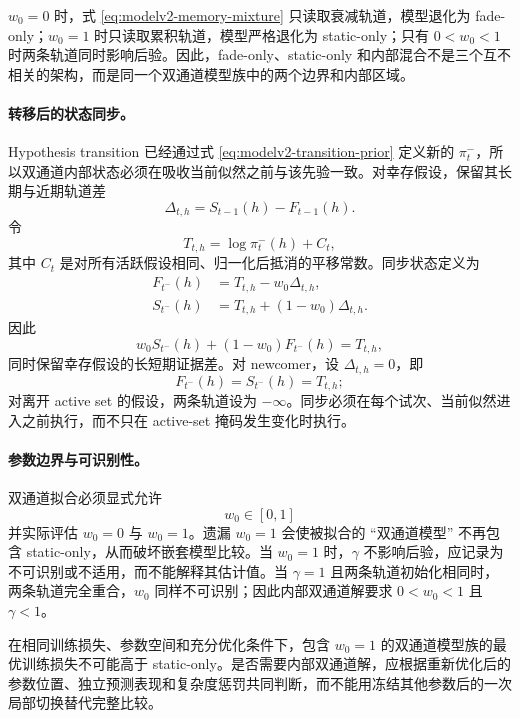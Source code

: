 $w_0=0$ 时，式 \ref{eq:modelv2-memory-mixture} 只读取衰减轨道，模型退化为 fade-only；$w_0=1$ 时只读取累积轨道，模型严格退化为 static-only；只有 $0<w_0<1$ 时两条轨道同时影响后验。因此，fade-only、static-only 和内部混合不是三个互不相关的架构，而是同一个双通道模型族中的两个边界和内部区域。

\paragraph{转移后的状态同步。}
Hypothesis transition 已经通过式 \ref{eq:modelv2-transition-prior} 定义新的 $\pi_t^-$，所以双通道内部状态必须在吸收当前似然之前与该先验一致。对幸存假设，保留其长期与近期轨道差
\begin{equation}
    \Delta_{t,h}
    =
    S_{t-1}(h)-F_{t-1}(h).
    \label{eq:modelv2-memory-offset}
\end{equation}
令
\begin{equation}
    T_{t,h}=\log\pi_t^-(h)+C_t ,
    \label{eq:modelv2-memory-target}
\end{equation}
其中 $C_t$ 是对所有活跃假设相同、归一化后抵消的平移常数。同步状态定义为
\begin{align}
    F_{t^-}(h)
    &=T_{t,h}-w_0\Delta_{t,h},\\
    S_{t^-}(h)
    &=T_{t,h}+(1-w_0)\Delta_{t,h}.
    \label{eq:modelv2-memory-sync}
\end{align}
因此
\[
    w_0S_{t^-}(h)+(1-w_0)F_{t^-}(h)=T_{t,h},
\]
同时保留幸存假设的长短期证据差。对 newcomer，设 $\Delta_{t,h}=0$，即
\[
    F_{t^-}(h)=S_{t^-}(h)=T_{t,h};
\]
对离开 active set 的假设，两条轨道设为 $-\infty$。同步必须在每个试次、当前似然进入之前执行，而不只在 active-set 掩码发生变化时执行。

\paragraph{参数边界与可识别性。}
双通道拟合必须显式允许
\begin{equation}
    w_0\in[0,1]
    \label{eq:modelv2-w0-range}
\end{equation}
并实际评估 $w_0=0$ 与 $w_0=1$。遗漏 $w_0=1$ 会使被拟合的 ``双通道模型'' 不再包含 static-only，从而破坏嵌套模型比较。当 $w_0=1$ 时，$\gamma$ 不影响后验，应记录为不可识别或不适用，而不能解释其估计值。当 $\gamma=1$ 且两条轨道初始化相同时，两条轨道完全重合，$w_0$ 同样不可识别；因此内部双通道解要求 $0<w_0<1$ 且 $\gamma<1$。

在相同训练损失、参数空间和充分优化条件下，包含 $w_0=1$ 的双通道模型族的最优训练损失不可能高于 static-only。是否需要内部双通道解，应根据重新优化后的参数位置、独立预测表现和复杂度惩罚共同判断，而不能用冻结其他参数后的一次局部切换替代完整比较。


